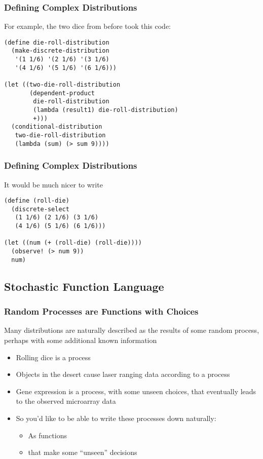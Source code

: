 \documentclass{beamer}
\begin{document}
\begin{frame}[fragile=singleslide]
  \frametitle{Defining Complex Distributions}
For example, the two dice from before took this code:
\begin{verbatim}
(define die-roll-distribution
  (make-discrete-distribution
   '(1 1/6) '(2 1/6) '(3 1/6)
   '(4 1/6) '(5 1/6) '(6 1/6)))

(let ((two-die-roll-distribution
       (dependent-product
        die-roll-distribution
        (lambda (result1) die-roll-distribution)
        +)))
  (conditional-distribution
   two-die-roll-distribution
   (lambda (sum) (> sum 9))))
\end{verbatim}

\end{frame}

\begin{frame}[fragile=singleslide]
  \frametitle{Defining Complex Distributions}
  It would be much nicer to write
\begin{verbatim}
(define (roll-die)
  (discrete-select
   (1 1/6) (2 1/6) (3 1/6)
   (4 1/6) (5 1/6) (6 1/6)))

(let ((num (+ (roll-die) (roll-die))))
  (observe! (> num 9))
  num)
\end{verbatim}
\end{frame}

\subsection{Stochastic Function Language}

\begin{frame}
  \frametitle{Random Processes are Functions with Choices}
  
  Many distributions are naturally described as the results of 
  some random process, perhaps with some additional known information
  \begin{itemize}
  \item Rolling dice is a process
  \item Objects in the desert cause laser ranging data according to a process
  \item Gene expression is a process, with some unseen choices, that 
  eventually leads to the observed microarray data
  \item So you'd like to be able to write these processes down naturally:
    \begin{itemize}
    \item As functions
    \item that make some ``unseen'' decisions 
    \end{itemize}
  \end{itemize}

\end{frame}
\end{document}
